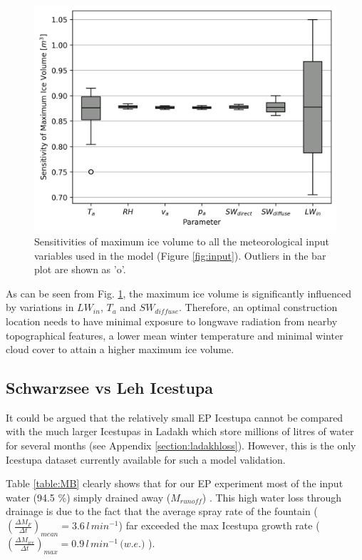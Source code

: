\documentclass[utf8]{frontiersSCNS} %
\begin{document}
\begin{figure} \begin{center} \includegraphics[width=10
cm]{Figures/Figure_11.jpg} \end{center} \caption{Sensitivities of maximum ice volume to all the meteorological input
  variables used in the model (Figure \ref{fig:input}).  Outliers in the bar plot are shown as 'o'.}
\label{fig:msensitivity} \end{figure}

As can be seen from Fig. \ref{fig:msensitivity}, the maximum ice volume is significantly influenced by variations in
$LW_{in}$, $T_a$ and $SW_{diffuse}$. Therefore, an optimal construction location needs to have minimal exposure to longwave
radiation from nearby topographical features, a lower mean winter temperature and minimal winter cloud cover to
attain a higher maximum ice volume. 

\subsection{Schwarzsee vs Leh Icestupa}
  
It could be argued that the relatively small EP Icestupa cannot be compared with the much larger Icestupas in
Ladakh which store millions of litres of water for several months (see Appendix \ref{section:ladakhloss}). However,
this is the only Icestupa dataset currently available for such a model validation.

Table \ref{table:MB} clearly shows that for our EP experiment most of the input water (94.5 \%) simply drained away
($M_{runoff}$) . This high water loss through drainage is due to the fact that the average spray rate of the fountain
($(\frac{\Delta M_{F}}{\Delta t})_{mean} = 3.6\, l\,min^{-1}$) far exceeded the max Icestupa growth rate
($(\frac{\Delta M_{ice}}{\Delta t})_{max} = 0.9\, l\,min^{-1}\, \textit{(w.e.)}$ ).
\end{document}
